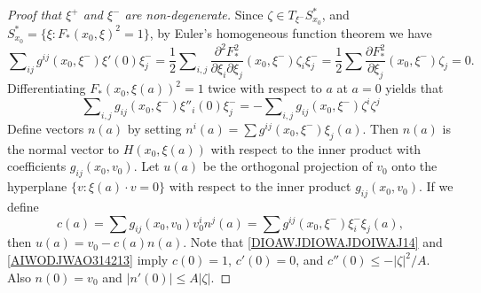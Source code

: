 \begin{proof}[Proof that $\xi^+$ and $\xi^-$ are non-degenerate]
    Since $\zeta \in T_{\xi^-} S_{x_0}^*$, and $S_{x_0}^* = \{ \xi : F_*(x_0,\xi)^2 = 1 \}$, by Euler's homogeneous function theorem we have
    \begin{equation} \label{DIOAWJDIOWAJDOIWAJ14}
        \sum\nolimits_{ij} g^{ij}(x_0,\xi^-) \xi'(0) \xi^-_j = \frac{1}{2} \sum\nolimits_{i,j} \frac{\partial^2 F_*^2}{\partial \xi_i \partial \xi_j}(x_0,\xi^-) \zeta_i \xi^-_j = \frac{1}{2} \sum \frac{\partial F_*^2}{\partial \xi_j}(x_0,\xi^-) \zeta_j = 0.
    \end{equation}
    Differentiating $F_*(x_0,\xi(a))^2 = 1$ twice with respect to $a$ at $a = 0$ yields that
    \begin{equation} \label{AIWODJWAO314213}
         \sum\nolimits_{i,j} g_{ij}(x_0,\xi^-) \xi''_i(0) \xi^-_j = - \sum\nolimits_{i,j} g_{ij}(x_0,\xi^-) \zeta^i \zeta^j
    \end{equation}
    Define vectors $n(a)$ by setting $n^i(a) = \sum g^{ij}(x_0,\xi^-) \xi_j(a)$. Then $n(a)$ is the normal vector to $H(x_0, \xi(a))$ with respect to the inner product with coefficients $g_{ij}(x_0,v_0)$.
    Let $u(a)$ be the orthogonal projection of $v_0$ onto the hyperplane $\{ v : \xi(a) \cdot v = 0 \}$ with respect to the inner product $g_{ij}(x_0,v_0)$. If we define
    \begin{equation}
        c(a) = \sum g_{ij}(x_0,v_0) v_0^i n^j(a) = \sum g^{ij}(x_0,\xi^-) \xi^-_i \xi_j(a),
    \end{equation}
    then $u(a) = v_0 - c(a) n(a)$. Note that \eqref{DIOAWJDIOWAJDOIWAJ14} and \eqref{AIWODJWAO314213} imply $c(0) = 1$, $c'(0) = 0$, and $c''(0) \leq - |\zeta|^2 / A$. Also $n(0) = v_0$ and $|n'(0)| \leq A |\zeta|$.


\end{proof}
